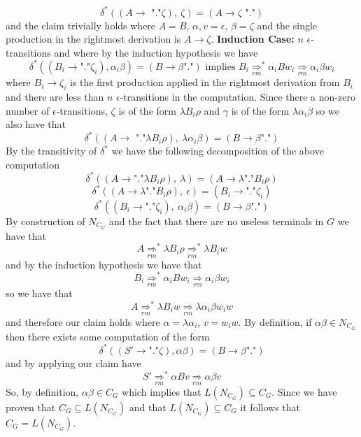 \documentclass[12pt]{article}
\begin{document}
$$\delta^*((A \rightarrow \text{ "."}\zeta),\ \zeta) =
(A \rightarrow \zeta\text{ "."})$$
and the claim trivially holds where $A=B$, $\alpha, v =\epsilon$, $\beta=\zeta$
and the single production in the rightmost derivation is $A \rightarrow \zeta$.
\medskip\newline
\textbf{Induction Case:} $n$ $\epsilon$-transitions and where by the induction
hypothesis we have
$$\delta^*((B_i \rightarrow\text{"."}\zeta_i), \alpha_i \beta) =
(B \rightarrow \beta\text{"."}) \text{ implies }
B_i \underset{rm}{\Longrightarrow}^* \alpha_i Bw_i
\underset{rm}{\Longrightarrow} \alpha_i \beta w_i$$
where $B_i \rightarrow \zeta_i$ is the first production applied
in the rightmost derivation from $B_i$ and there are less than $n$
$\epsilon$-transitions in the computation. Since there a non-zero number of
$\epsilon$-transitions, $\zeta$ is of the form $\lambda B_i\rho$
and $\gamma$ is of the form $\lambda \alpha_i \beta$ so we also have that
$$\delta^*((A \rightarrow \text{ "."}\lambda B_i\rho),\ \lambda\alpha_i\beta) =
(B \rightarrow \beta\text{"."})$$
By the transitivity of $\delta^*$ we have the following decomposition of the
above computation
$$\delta^*((A\rightarrow \text{"."}\lambda B_i\rho),\ \lambda) =
(A\rightarrow \lambda\text{"."}B_i\rho)$$
$$\delta^*((A\rightarrow \lambda\text{"."}B_i\rho),\ \epsilon) =
(B_i \rightarrow \text{"."}\zeta_i)$$
$$\delta^*((B_i \rightarrow \text{"."}\zeta_i),\ \alpha_i\beta) =
(B\rightarrow \beta\text{"."})$$
By construction of $N_{C_G}$ and the fact that there are no useless terminals in
$G$ we have that
$$A \underset{rm}{\Longrightarrow}^* \lambda B_i \rho
\underset{rm}{\Longrightarrow}^* \lambda B_i w$$
and by the induction hypothesis we have that
$$B_i \underset{rm}{\Longrightarrow}^* \alpha_i Bw_i
\underset{rm}{\Longrightarrow} \alpha_i \beta w_i$$
so we have that
$$A \underset{rm}{\Longrightarrow}^* \lambda B_i w
\underset{rm}{\Longrightarrow} \lambda\alpha_i \beta w_i w$$
and therefore our claim holds where $\alpha = \lambda\alpha_i$, $v=w_iw$.
By definition, if $\alpha\beta \in N_{C_G}$ then there exists some computation
of the form
$$\delta^*((S'\rightarrow \text{"."}\zeta),\alpha\beta) =
(B\rightarrow \beta\text{"."})$$
and by applying our claim have
$$ S' \underset{rm}{\Longrightarrow}^* \alpha Bv
\underset{rm}{\Longrightarrow} \alpha\beta v$$
So, by definition, $\alpha\beta \in C_G$ which implies that
$L(N_{C_G}) \subseteq C_G$.
\medskip\newline
Since we have proven that $C_G \subseteq L(N_{C_G})$
and that $L(N_{C_G}) \subseteq C_G$ it follows that $C_G = L(N_{C_G})$.
\end{document}
